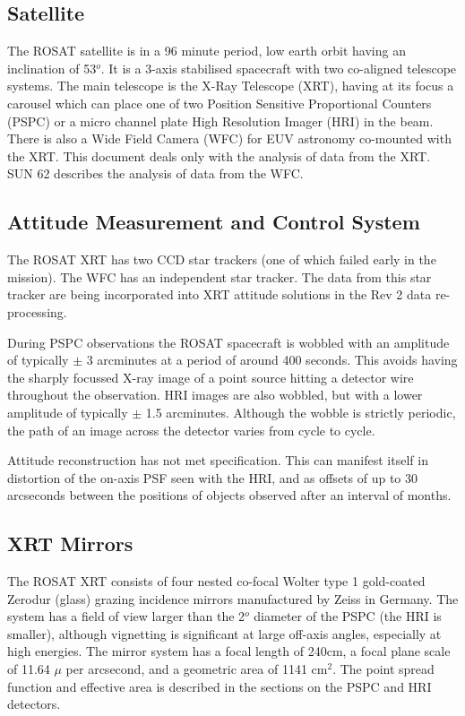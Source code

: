 \documentclass[11pt,fleqn]{article}    %
\begin{document}
\subsection{Satellite}
The ROSAT satellite is in a 96 minute period, low earth orbit having an
inclination of 53$^o$. It is a 3-axis stabilised spacecraft with two
co-aligned telescope systems. The main telescope is the X-Ray Telescope
(XRT), having at its focus a carousel which can place one of two Position
Sensitive Proportional Counters (PSPC) or a micro channel plate High
Resolution Imager (HRI) in the beam. There is also a Wide Field Camera
(WFC) for EUV astronomy co-mounted with the XRT. This document deals
only with the analysis of data from the XRT. SUN 62 describes the analysis
of data from the WFC.

\subsection{Attitude Measurement and Control System}
The ROSAT XRT has two CCD star trackers (one of which failed early in the
mission). The WFC has an independent star tracker. The data from this
star tracker are being incorporated into XRT attitude solutions in the Rev
2 data re-processing.

During PSPC observations the ROSAT spacecraft is wobbled with an
amplitude of typically $\pm$ 3 arcminutes at a period of around 400
seconds. This avoids having the sharply focussed X-ray image of a point
source hitting a detector wire throughout the observation. HRI images are
also wobbled, but with a lower amplitude of typically $\pm$ 1.5 arcminutes.
Although the wobble is strictly periodic, the path of an image across the
detector varies from cycle to cycle.

Attitude reconstruction has not met specification. This can manifest
itself in distortion of the on-axis PSF seen with the HRI, and as offsets
of up to 30 arcseconds between the positions of objects observed after an
interval of months. 

\subsection{XRT Mirrors}
The ROSAT XRT consists of four nested co-focal Wolter type 1 gold-coated
Zerodur (glass) grazing incidence mirrors manufactured by Zeiss in
Germany. The system has a field of view larger than the 2$^o$ diameter of
the PSPC (the HRI is smaller), although vignetting is significant at large
off-axis angles, especially at high energies. The mirror system has a focal
length of 240cm, a focal plane scale of 11.64 $\mu$ per arcsecond, and a
geometric area of 1141 cm$^2$. The point spread function and effective area
is described in the sections on the PSPC and HRI detectors.
\end{document}
